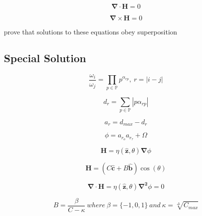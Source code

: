 \documentclass[sn-mathphys]{sn-jnl}%
\begin{document}
\begin{equation}
  \boldsymbol{\nabla \cdot H}=0\label{harmonyFieldStaticsEq}
\end{equation}

\begin{equation}
  \boldsymbol{\nabla \times H}=0\label{harmonyCurlStaticsEq}
\end{equation}

prove that solutions to these equations obey superposition

\subsection{Special Solution}

\begin{equation}
  \frac{\omega_{i}}{\omega_{j}} = \prod_{p \in \mathbb{P}} p^{\alpha_{rp}}, \ r=|i-j|
\end{equation}

\begin{equation}
  d_r = \sum_{p \in \mathbb{P}} \left| p \alpha_{rp} \right|
\end{equation}

\begin{equation}
  a_r = d_{max} - d_r
\end{equation}

\begin{equation}
  \phi=a_{r_o} a_{r_\tau} + \Omega
\end{equation}

\begin{equation}
  \boldsymbol{H}=\eta(\boldsymbol{\hat{z}},\theta)\boldsymbol{\nabla}\phi \label{harmonyEq}  
\end{equation}

\begin{equation}
  \boldsymbol{H}=(C\boldsymbol{\hat{c}}+B\boldsymbol{\hat{b}})\cos(\theta) \label{consonanceEq}
\end{equation}

\begin{equation}
  \boldsymbol{\nabla \cdot H}=\eta(\boldsymbol{\hat{z}},\theta)\boldsymbol{\nabla^2}\phi = 0  \label{poissonEq}
\end{equation}

\begin{equation}
  B=\frac{\beta}{C-\kappa} \ where \ \beta=\{-1,0,1\}  \ and \  \kappa = \sqrt[\Delta]{C_{max}} \label{brillianceEq}
\end{equation}
\end{document}
